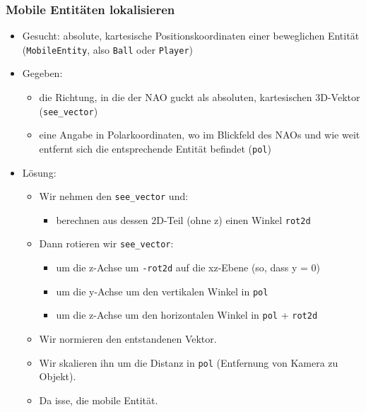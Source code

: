 \subsubsection*{Mobile Entitäten lokalisieren}
\begin{itemize}
\item  Gesucht: absolute, kartesische Positionskoordinaten einer beweglichen Entität (\texttt{MobileEntity}, also \texttt{Ball} oder \texttt{Player})
\item  Gegeben:
\begin{itemize}
	\item  die Richtung, in die der NAO guckt als absoluten, kartesischen 3D-Vektor (\texttt{see\_vector})
	\item  eine Angabe in Polarkoordinaten, wo im Blickfeld des NAOs und wie weit entfernt sich die entsprechende Entität befindet (\texttt{pol})
\end{itemize}
\item  Lösung:
\begin{itemize}
	\item  Wir nehmen den \texttt{see\_vector} und:
	\begin{itemize}
		\item  berechnen aus dessen 2D-Teil (ohne z) einen Winkel \texttt{rot2d}
	\end{itemize}
	\item  Dann rotieren wir \texttt{see\_vector}:
	\begin{itemize}
		\item  um die z-Achse um \texttt{-rot2d} auf die xz-Ebene (so, dass y = 0)
		\item  um die y-Achse um den vertikalen Winkel in \texttt{pol}
		\item  um die z-Achse um den horizontalen Winkel in \texttt{pol} + \texttt{rot2d}
	\end{itemize}
	\item  Wir normieren den entstandenen Vektor.
	\item  Wir skalieren ihn um die Distanz in \texttt{pol} (Entfernung von Kamera zu Objekt).
	\item  Da isse, die mobile Entität.
	\end{itemize}
\end{itemize}
